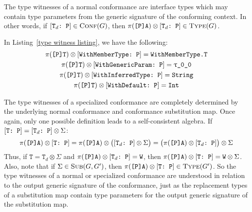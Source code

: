 \documentclass[../generics]{subfiles}
\begin{document}
The type witnesses of a normal conformance are interface types which may contain type parameters from the generic signature of the conforming context. In other words, if $[\texttt{$\texttt{T}_d$:~P}]\in\textsc{Conf}({G})$, then $\pi(\texttt{[P]A})\otimes[\texttt{$\texttt{T}_d$:~P}]\in\textsc{Type}({G})$.

In Listing~\ref{type witness listing}, we have the following:
\begin{gather*}
\pi(\texttt{[P]T})\otimes[\texttt{WithMemberType:~P}]=\texttt{WithMemberType.T}\\
\pi(\texttt{[P]T})\otimes[\texttt{WithGenericParam:~P}]=\texttt{$\uptau$\_0\_0}\\
\pi(\texttt{[P]T})\otimes[\texttt{WithInferredType:~P}]=\texttt{String}\\
\pi(\texttt{[P]T})\otimes[\texttt{WithDefault:~P}]=\texttt{Int}
\end{gather*}

The type witnesses of a specialized conformance are completely determined by the underlying normal conformance and conformance substitution map. Once again, only one possible definition leads to a self-consistent algebra. If $[\texttt{T:~P}] = [\texttt{$\texttt{T}_d$:~P}]\otimes\Sigma$:
\[
\pi(\texttt{[P]A}) \otimes [\texttt{T:~P}] = \pi(\texttt{[P]A}) \otimes \bigl([\texttt{$\texttt{T}_d$:~P}]\otimes\Sigma\bigr) = \bigl(\pi(\texttt{[P]A}) \otimes[\texttt{$\texttt{T}_d$:~P}]\bigr)\otimes\Sigma
\]
Thus, if $\texttt{T}=\texttt{T}_d\otimes\Sigma$ and $\pi(\texttt{[P]A})\otimes[\texttt{$\texttt{T}_d$:~P}]=\texttt{W}$, then $\pi(\texttt{[P]A})\otimes[\texttt{T:~P}]=\texttt{W}\otimes\Sigma$. Also, note that if $\Sigma\in\textsc{Sub}({G, G^\prime})$, then $\pi(\texttt{[P]A}) \otimes [\texttt{T:~P}]\in\textsc{Type}({G^\prime})$. So the type witnesses of a normal or specialized conformance are understood in relation to the output generic signature of the conformance, just as the replacement types of a substitution map contain type parameters for the output generic signature of the substitution map.
\end{document}
